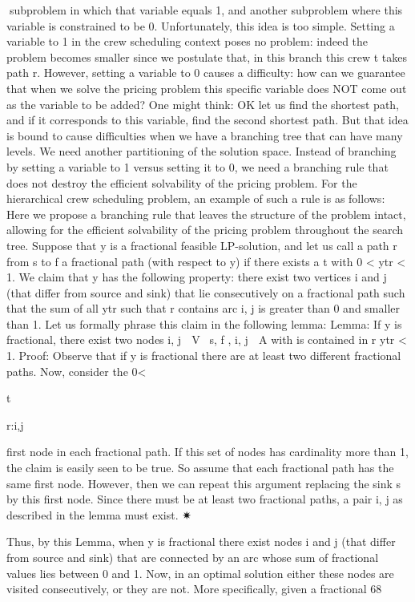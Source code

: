 \documentclass[titlepage]{book}
\theoremstyle{plain}
\theoremstyle{definition}
\theoremstyle{remark}
\begin{document}
subproblem in which that variable equals 1, and another subproblem where this variable is constrained to
be 0. Unfortunately, this idea is too simple. Setting a variable to 1 in the crew scheduling context poses
no problem: indeed the problem becomes smaller since we postulate that, in this branch this crew t takes
path r. However, setting a variable to 0 causes a difficulty: how can we guarantee that when we solve
the pricing problem this specific variable does NOT come out as the variable to be added? One might
think: OK let us find the shortest path, and if it corresponds to this variable, find the second shortest
path. But that idea is bound to cause difficulties when we have a branching tree that can have many
levels.
We need another partitioning of the solution space. Instead of branching by setting a variable to 1 versus
setting it to 0, we need a branching rule that does not destroy the efficient solvability of the pricing
problem. For the hierarchical crew scheduling problem, an example of such a rule is as follows: Here
we propose a branching rule that leaves the structure of the problem intact, allowing for the efficient
solvability of the pricing problem throughout the search tree.
Suppose that y is a fractional feasible LP-solution, and let us call a path r from s to f a fractional path
(with respect to y) if there exists a t with 0 < ytr < 1. We claim that y has the following property: there
exist two vertices i and j (that differ from source and sink) that lie consecutively on a fractional path
such that the sum of all ytr such that r contains arc {i, j} is greater than 0 and smaller than 1. Let us
formally phrase this claim in the following lemma:
Lemma: If y is fractional, there exist two nodes i, j ∈ V \ {s, f }, {i, j} ∈ A with
is contained in r ytr < 1.
Proof: Observe that if y is fractional there are at least two different fractional paths. Now, consider the
0<

t

r:{i,j}

first node in each fractional path. If this set of nodes has cardinality more than 1, the claim is easily seen
to be true. So assume that each fractional path has the same first node. However, then we can repeat
this argument replacing the sink s by this first node. Since there must be at least two fractional paths,
a pair i, j as described in the lemma must exist.
✷

Thus, by this Lemma, when y is fractional there exist nodes i and j (that differ from source and sink)
that are connected by an arc whose sum of fractional values lies between 0 and 1. Now, in an optimal
solution either these nodes are visited consecutively, or they are not. More specifically, given a fractional
68
\end{document}

